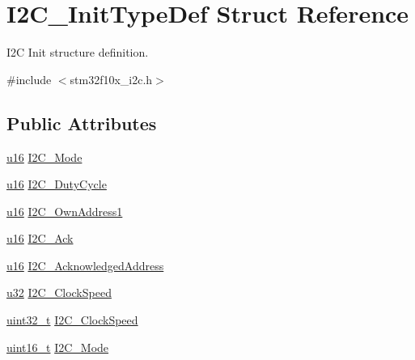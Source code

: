 \hypertarget{struct_i2_c___init_type_def}{}\section{I2\+C\+\_\+\+Init\+Type\+Def Struct Reference}
\label{struct_i2_c___init_type_def}


I2C Init structure definition.  




{\ttfamily \#include $<$stm32f10x\+\_\+i2c.\+h$>$}

\subsection*{Public Attributes}
\begin{DoxyCompactItemize}
\item 
\hyperlink{agilefox_2library_2inc_2stm32f10x__type_8h_a9e6c91d77e24643b888dbd1a1a590054}{u16} \hyperlink{struct_i2_c___init_type_def_aca395c806c120c0a1658ab303f2ca44c}{I2\+C\+\_\+\+Mode}
\item 
\hyperlink{agilefox_2library_2inc_2stm32f10x__type_8h_a9e6c91d77e24643b888dbd1a1a590054}{u16} \hyperlink{struct_i2_c___init_type_def_aec48bda7cf5ba2772f11e9d6161b8005}{I2\+C\+\_\+\+Duty\+Cycle}
\item 
\hyperlink{agilefox_2library_2inc_2stm32f10x__type_8h_a9e6c91d77e24643b888dbd1a1a590054}{u16} \hyperlink{struct_i2_c___init_type_def_ad4e6a2d4e93b55e48070c95b44615fb7}{I2\+C\+\_\+\+Own\+Address1}
\item 
\hyperlink{agilefox_2library_2inc_2stm32f10x__type_8h_a9e6c91d77e24643b888dbd1a1a590054}{u16} \hyperlink{struct_i2_c___init_type_def_a3ee454a81b4520ee58d687fd6484d65c}{I2\+C\+\_\+\+Ack}
\item 
\hyperlink{agilefox_2library_2inc_2stm32f10x__type_8h_a9e6c91d77e24643b888dbd1a1a590054}{u16} \hyperlink{struct_i2_c___init_type_def_a4f88001fea5f77ac61db6dd5bb9cb09f}{I2\+C\+\_\+\+Acknowledged\+Address}
\item 
\hyperlink{agilefox_2library_2inc_2stm32f10x__type_8h_a2caf5cd7bcdbe1eefa727f44ffb10bac}{u32} \hyperlink{struct_i2_c___init_type_def_a662c9f2c1d94730213ab952a8be1974a}{I2\+C\+\_\+\+Clock\+Speed}
\item 
\hyperlink{_p_e___types_8h_a33594304e786b158f3fb30289278f5af}{uint32\+\_\+t} \hyperlink{struct_i2_c___init_type_def_a737c289f4515ae4cb642db0412762169}{I2\+C\+\_\+\+Clock\+Speed}
\item 
\hyperlink{_p_e___types_8h_a1f1825b69244eb3ad2c7165ddc99c956}{uint16\+\_\+t} \hyperlink{struct_i2_c___init_type_def_ad5cf353c5b6968b3610b70ca593cec52}{I2\+C\+\_\+\+Mode}

\end{DoxyCompactItemize}
